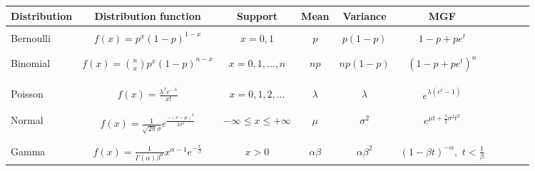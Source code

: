 \documentclass{article}
\begin{document}
\begin{center}
\begin{tabular}{| l | c | c | c | c | c | c |c |c |c |}
    \hline
    Distribution    & Distribution function & Support  &   Mean    &   Variance  & MGF \\
    \hline
    \hfill          &               &           &           &               & \\
    Bernoulli       & $f(x) = p^{x} (1 - p)^{1-x}$                & $x = 0, 1$    &   $p$     &   $p (1 - p)$   & $1 - p + p e^t$ \\
    \hfill          &               &           &           &               & \\
    \hline
    \hfill          &               &           &           &               & \\
    Binomial        & $f(x) = \displaystyle{n \choose x} p^{x} (1 - p)^{n-x}$  & $x = 0, 1, \ldots, n$    &   $np$     &   $n p (1 - p)$   & $(1 - p + p e^t)^n$ \\
    \hfill          &               &           &           &               & \\
    \hfill          &               &           &           &               & \\
    \hline
    \hfill          &               &           &           &               & \\
	Poisson   & $f(x) = \displaystyle\frac{\lambda^x e^{-\lambda}}{x!}$  & $x = 0, 1, 2, \dots$ & $\lambda$ & $\lambda$ & 
	$e^{\lambda(e^t - 1)}$ \\
    \hfill          &               &           &           &               & \\
    \hline
    \hfill          &               &           &           &               & \\
Normal          & $f(x) = \displaystyle\frac{1}{\sqrt{2\pi}\sigma}e^{\frac{-(x-\mu)^{2}}{2\sigma^{2}}}$  & $-\infty \leq x \leq +\infty$ & $\mu$ & $\sigma^{2}$ & $e^{\mu t + \frac{1}{2} \sigma^2 t^2}$ \\
    \hfill          &               &           &           &               & \\
    \hline
    \hfill          &               &           &           &               & \\
Gamma        & $f(x) = \displaystyle\frac{1}{ \Gamma(\alpha)\beta^{\alpha} } x^{\alpha-1} e^{-\frac{x}{\beta}}  $  & $x>0$ & $\alpha\beta$ & $\alpha\beta^2$ & $(1 - \beta t)^{-\alpha}, \,\, t < \frac{1}{\beta}$ \\

\end{tabular}
\end{center}
\end{document}
